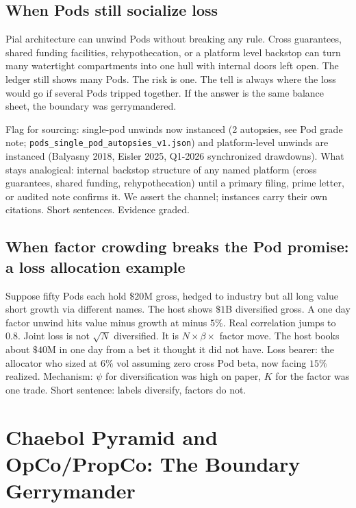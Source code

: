 \documentclass[11pt]{article}
\begin{document}
\subsection{When Pods still socialize loss}

Pial architecture can unwind Pods without breaking any rule. Cross guarantees, shared funding facilities, rehypothecation, or a platform level backstop can turn many watertight compartments into one hull with internal doors left open. The ledger still shows many Pods. The risk is one. The tell is always where the loss would go if several Pods tripped together. If the answer is the same balance sheet, the boundary was gerrymandered.

Flag for sourcing: single-pod unwinds now instanced (2 autopsies, see Pod grade note; \texttt{pods\_single\_pod\_autopsies\_v1.json}) and platform-level unwinds are instanced (Balyasny 2018, Eisler 2025, Q1-2026 synchronized drawdowns). What stays analogical: internal backstop structure of any named platform (cross guarantees, shared funding, rehypothecation) until a primary filing, prime letter, or audited note confirms it. We assert the channel; instances carry their own citations. Short sentences. Evidence graded.

\subsection{When factor crowding breaks the Pod promise: a loss allocation example}
Suppose fifty Pods each hold $\$20$M gross, hedged to industry but all long value short growth via different names. The host shows $\$1$B diversified gross. A one day factor unwind hits value minus growth at minus $5\%$. Real correlation jumps to $0.8$. Joint loss is not $\sqrt{N}$ diversified. It is $N \times \beta \times$ factor move. The host books about $\$40$M in one day from a bet it thought it did not have. Loss bearer: the allocator who sized at $6\%$ vol assuming zero cross Pod beta, now facing $15\%$ realized. Mechanism: $\psi$ for diversification was high on paper, $K$ for the factor was one trade. Short sentence: labels diversify, factors do not.

\section{Chaebol Pyramid and OpCo/PropCo: The Boundary Gerrymander}
\label{sec:chaebol}
\end{document}

